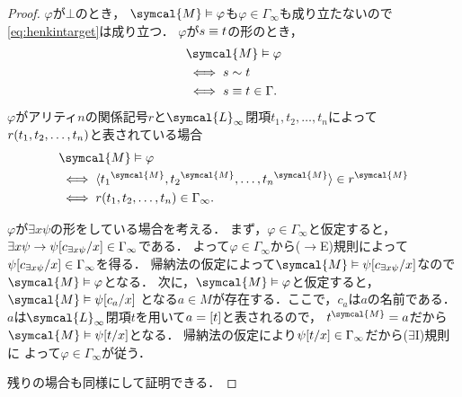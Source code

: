 \begin{proof}
	\(\varphi\)が\(\bot\)のとき，
	\(\symcal{M} \satisfy \varphi\)も\(\varphi \in \Gamma_\infty\)も成り立たないので
	\cref{eq:henkintarget}は成り立つ．
	\(\varphi\)が\(s \equiv t\)の形のとき，
	\begin{align*}
		 & \symcal{M} \satisfy \varphi            \\
		 & \metaequivalent s \sim t               \\
		 & \metaequivalent s \objeq t \in \Gamma.
	\end{align*}
	\(\varphi\)がアリティ\(n\)の関係記号\(r\)と\(\symcal{L}_\infty\)閉項\(t_1, t_2, \dots, t_n\)によって
	\(\apply{r}{t_1, t_2, \dots, t_n}\)と表されている場合
	\begin{align*}
		 & \symcal{M} \satisfy \varphi                                        \\
		 & \metaequivalent \pair{
			\interpretation{\symcal{M}}{t_1},
			\interpretation{\symcal{M}}{t_2},
			\dots,
			\interpretation{\symcal{M}}{t_n}
		}
		\in \interpretation{\symcal{M}}{r}                                    \\
		 & \metaequivalent \apply{r}{t_1, t_2, \dots, t_n} \in \Gamma_\infty.
	\end{align*}

	\(\varphi\)が\(\exists x \psi\)の形をしている場合を考える．
	まず，\(\varphi \in \Gamma_\infty\)と仮定すると，
	\(\exists x \psi \to \subst{\psi}{c_{\exists x \psi}/x} \in \Gamma_\infty\)である．
	よって\(\varphi \in \Gamma_\infty\)から(\(\to\)E)規則によって
	\(\subst{\psi}{c_{\exists x \psi}/x} \in \Gamma_\infty\)を得る．
	帰納法の仮定によって\(\symcal{M} \satisfy \subst{\psi}{c_{\exists x \psi}/x}\)なので
	\(\symcal{M} \satisfy \varphi\)となる．
	次に，\(\symcal{M} \satisfy \varphi\)と仮定すると，\(\symcal{M} \satisfy \subst{\psi}{c_a/x}\)
	となる\(a \in M\)が存在する．ここで，\(c_a\)は\(a\)の名前である．
	\(a\)は\(\symcal{L}_\infty\)閉項\(t\)を用いて\(a = \equivclass{t}\)と表されるので，
	\(\interpretation{\symcal{M}}{t} = a\)だから\(\symcal{M} \satisfy \subst{\psi}{t/x}\)となる．
	帰納法の仮定により\(\subst{\psi}{t/x} \in \Gamma_\infty\)だから(\(\exists\)I)規則に
	よって\(\varphi \in \Gamma_\infty\)が従う．

	残りの場合も同様にして証明できる．
\end{proof}


